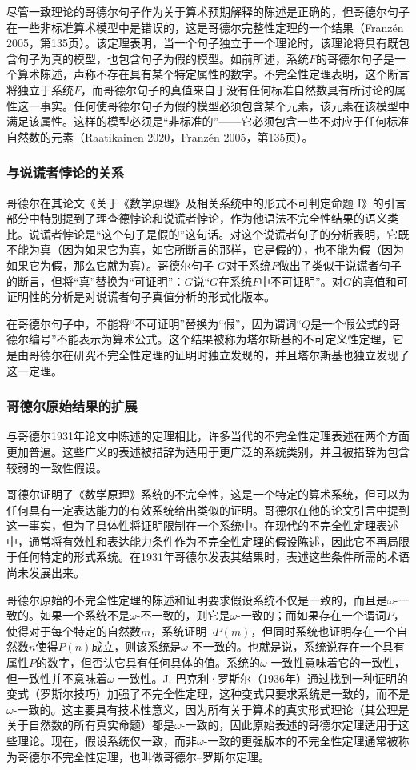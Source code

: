 尽管一致理论的哥德尔句子作为关于算术预期解释的陈述是正确的，但哥德尔句子在一些非标准算术模型中是错误的，这是哥德尔完整性定理的一个结果（Franzén 2005，第135页）。该定理表明，当一个句子独立于一个理论时，该理论将具有既包含句子为真的模型，也包含句子为假的模型。如前所述，系统\( F \)的哥德尔句子是一个算术陈述，声称不存在具有某个特定属性的数字。不完全性定理表明，这个断言将独立于系统\( F \)，而哥德尔句子的真值来自于没有任何标准自然数具有所讨论的属性这一事实。任何使哥德尔句子为假的模型必须包含某个元素，该元素在该模型中满足该属性。这样的模型必须是“非标准的”——它必须包含一些不对应于任何标准自然数的元素（Raatikainen 2020，Franzén 2005，第135页）。
\subsubsection{与说谎者悖论的关系} 
哥德尔在其论文《关于《数学原理》及相关系统中的形式不可判定命题 I》的引言部分中特别提到了理查德悖论和说谎者悖论，作为他语法不完全性结果的语义类比。说谎者悖论是“这个句子是假的”这句话。对这个说谎者句子的分析表明，它既不能为真（因为如果它为真，如它所断言的那样，它是假的），也不能为假（因为如果它为假，那么它就为真）。哥德尔句子 \( G \)对于系统\( F \)做出了类似于说谎者句子的断言，但将“真”替换为“可证明”：\( G \)说“\( G \)在系统\( F \)中不可证明”。对\( G \)的真值和可证明性的分析是对说谎者句子真值分析的形式化版本。

在哥德尔句子中，不能将“不可证明”替换为“假”，因为谓词“\( Q \)是一个假公式的哥德尔编号”不能表示为算术公式。这个结果被称为塔尔斯基的不可定义性定理，它是由哥德尔在研究不完全性定理的证明时独立发现的，并且塔尔斯基也独立发现了这一定理。
\subsubsection{哥德尔原始结果的扩展} 
与哥德尔1931年论文中陈述的定理相比，许多当代的不完全性定理表述在两个方面更加普遍。这些广义的表述被措辞为适用于更广泛的系统类别，并且被措辞为包含较弱的一致性假设。

哥德尔证明了《数学原理》系统的不完全性，这是一个特定的算术系统，但可以为任何具有一定表达能力的有效系统给出类似的证明。哥德尔在他的论文引言中提到这一事实，但为了具体性将证明限制在一个系统中。在现代的不完全性定理表述中，通常将有效性和表达能力条件作为不完全性定理的假设陈述，因此它不再局限于任何特定的形式系统。在1931年哥德尔发表其结果时，表述这些条件所需的术语尚未发展出来。

哥德尔原始的不完全性定理的陈述和证明要求假设系统不仅是一致的，而且是\( \omega \)-一致的。如果一个系统不是\( \omega \)-不一致的，则它是\( \omega \)-一致的；而如果存在一个谓词\( P \)，使得对于每个特定的自然数\( m \)，系统证明\( \neg P(m) \)，但同时系统也证明存在一个自然数\( n \)使得\( P(n) \)成立，则该系统是\( \omega \)-不一致的。也就是说，系统说存在一个具有属性\( P \)的数字，但否认它具有任何具体的值。系统的\( \omega \)-一致性意味着它的一致性，但一致性并不意味着\( \omega \)-一致性。J. 巴克利·罗斯尔（1936年）通过找到一种证明的变式（罗斯尔技巧）加强了不完全性定理，这种变式只要求系统是一致的，而不是\( \omega \)-一致的。这主要具有技术性意义，因为所有关于算术的真实形式理论（其公理是关于自然数的所有真实命题）都是\( \omega \)-一致的，因此原始表述的哥德尔定理适用于这些理论。现在，假设系统仅一致，而非\( \omega \)-一致的更强版本的不完全性定理通常被称为哥德尔不完全性定理，也叫做哥德尔–罗斯尔定理。
